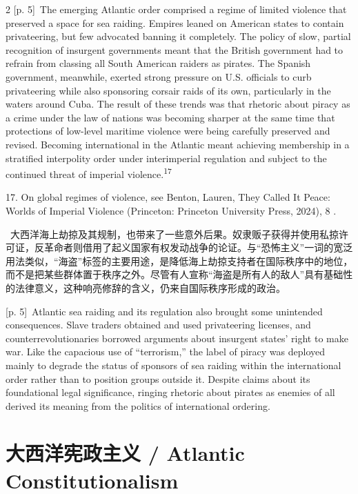 \documentclass[10pt,a4paper]{article}
\begin{document}
\begin{paracol}{2}
{\scriptsize\color{gray} [p. 5]}\ The emerging Atlantic order comprised a regime of limited violence that preserved a space for sea raiding. Empires leaned on American states to contain privateering, but few advocated banning it completely. The policy of slow, partial recognition of insurgent governments meant that the British government had to refrain from classing all South American raiders as pirates. The Spanish government, meanwhile, exerted strong pressure on U.S. officials to curb privateering while also sponsoring corsair raids of its own, particularly in the waters around Cuba. The result of these trends was that rhetoric about piracy as a crime under the law of nations was becoming sharper at the same time that protections of low-level maritime violence were being carefully preserved and revised. Becoming international in the Atlantic meant achieving membership in a stratified interpolity order under interimperial regulation and subject to the continued threat of imperial violence.\nobreak\textsuperscript{17}\par{\small 17. On global regimes of violence, see Benton, Lauren, They Called It Peace: Worlds of Imperial Violence (Princeton: Princeton University Press, 2024), 8 .\par}
\switchcolumn*
{\scriptsize\color{gray} [p. 5]}\ 大西洋海上劫掠及其规制，也带来了一些意外后果。奴隶贩子获得并使用私掠许可证，反革命者则借用了起义国家有权发动战争的论证。与“恐怖主义”一词的宽泛用法类似，“海盗”标签的主要用途，是降低海上劫掠支持者在国际秩序中的地位，而不是把某些群体置于秩序之外。尽管有人宣称“海盗是所有人的敌人”具有基础性的法律意义，这种响亮修辞的含义，仍来自国际秩序形成的政治。\par
\switchcolumn
{\scriptsize\color{gray} [p. 5]}\ Atlantic sea raiding and its regulation also brought some unintended consequences. Slave traders obtained and used privateering licenses, and counterrevolutionaries borrowed arguments about insurgent states’ right to make war. Like the capacious use of “terrorism,” the label of piracy was deployed mainly to degrade the status of sponsors of sea raiding within the international order rather than to position groups outside it. Despite claims about its foundational legal significance, ringing rhetoric about pirates as enemies of all derived its meaning from the politics of international ordering.\par
\switchcolumn*
\end{paracol}
\section*{大西洋宪政主义 / Atlantic Constitutionalism}
\end{document}
